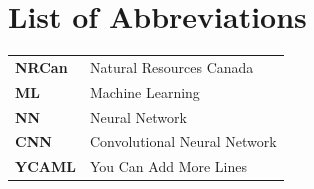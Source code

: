 \chapter{List of Abbreviations}

\def\arraystretch{1.5}
\begin{longtable}[l]{l l}
    \textbf{NRCan} & Natural Resources Canada     \\
    \textbf{ML}    & Machine Learning             \\
    \textbf{NN}    & Neural Network               \\
    \textbf{CNN}   & Convolutional Neural Network \\
    \textbf{YCAML} & You Can Add More Lines       \\
\end{longtable}
\def\arraystretch{1}
